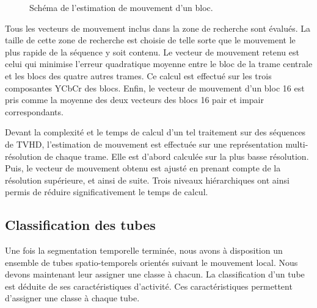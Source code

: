 \begin{figure}[htbp]
	\centering
	\begin{tikzpicture}[scale=0.5]
		
	\end{tikzpicture}
	\caption{Schéma de l'estimation de mouvement d'un bloc.}
  \label{fig:tubeDansImage}
\end{figure}

Tous les vecteurs de mouvement inclus dans la zone de recherche sont évalués. La taille de cette zone de recherche est choisie de telle sorte que le mouvement le plus rapide de la séquence y soit contenu. Le vecteur de mouvement retenu est celui qui minimise l'erreur quadratique moyenne entre le bloc de la trame centrale et les blocs des quatre autres trames. Ce calcul est effectué sur les trois composantes YCbCr des blocs. Enfin, le vecteur de mouvement d'un bloc 16 est pris comme la moyenne des deux vecteurs des blocs 16 pair et impair correspondants.

Devant la complexité et le temps de calcul d'un tel traitement sur des séquences de TVHD, l'estimation de mouvement est effectuée sur une représentation multi-résolution de chaque trame. Elle est d'abord calculée sur la plus basse résolution. Puis, le vecteur de mouvement obtenu est ajusté en prenant compte de la résolution supérieure, et ainsi de suite. Trois niveaux hiérarchiques ont ainsi permis de réduire significativement le temps de calcul.


\subsection{Classification des tubes}
Une fois la segmentation temporelle terminée, nous avons à disposition un ensemble de tubes spatio-temporels orientés suivant le mouvement local. Nous devons maintenant leur assigner une classe à chacun. %
La classification d'un tube est déduite de ses caractéristiques d'activité. Ces caractéristiques permettent d'assigner une classe à chaque tube.


